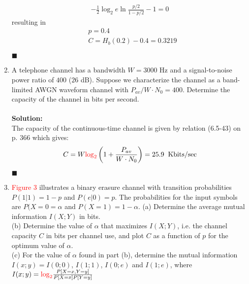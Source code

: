 \documentclass[a4paper,12pt]{article}
\begin{document}
\begin{enumerate}
            \begin{align*}
                -\frac{1}{2} \log_2 e \ln \frac{p/2}{1 - p/2} - 1 = 0
            \end{align*}
            resulting in 
            \begin{align*}
               & p = 0.4 \\ 
               & C = H_b(0.2) - 0.4 = 0.3219
            \end{align*}
            \begin{flushright}
                $\blacksquare$
            \end{flushright}
        \item
            A telephone channel has a bandwidth $W = 3000$ Hz and a signal-to-noise power ratio of $400$ ($26$ dB). Suppose we characterize the channel as a band-limited AWGN waveform channel with $P_{av}/W \cdot N_0 = 400$. Determine the capacity of the channel in bits per second. \\ \\ 
            \textbf{Solution:} \\
            The capacity of the continuous-time channel is given by relation (6.5-43) on p. 366 which gives: 
            \begin{align*}
                C = W \textcolor{red}{\log_2} \left( 1 + \frac{P_{av}}{W \cdot N_0} \right) = 25.9 \;\; \text{Kbits/sec}
            \end{align*}
            \begin{flushright}
                $\blacksquare$
            \end{flushright}
        \item 
            \textcolor{red}{Figure 3} illustrates a binary erasure channel with transition probabilities $P(1|1) = 1 - p$ and $P(e|0) = p$. The probabilities for the input symbols are $P(X = 0 = \alpha$ and $P(X = 1) = 1 - \alpha$.
            (a) Determine the average mutual information $I(X;Y)$ in bits. \\ 
            (b) Determine the value of $\alpha$ that maximizes $I(X;Y)$, i.e. the channel capacity $C$ in bits per channel use, and plot $C$ as a function of $p$ for the optimum value of $\alpha$. \\
            (c) For the value of $\alpha$ found in part (b), determine the mutual information $I(x;y) = I(0;0)$, $I(1;1)$, $I(0;e)$ and $I(1;e)$, where $I(x;y) = \textcolor{red}{\log_2} \frac{P[X = x, Y = y]}{P[X = x]P[Y = y]}$

\end{enumerate}
\end{document}
